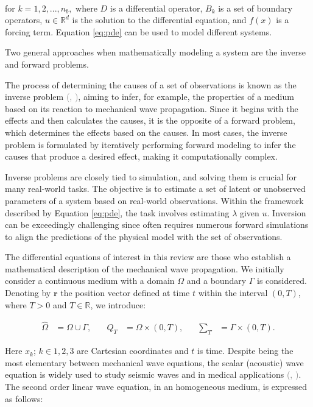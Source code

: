 \documentclass{tufte-handout}
\renewcommand{\citep}[2][]{\textcolor{gray}{(\citeauthor{#2}, \citeyear[#1]{#2})}}
\begin{document}
\

 for $k = 1, 2, ..., n_b,$ where $D$ is a differential operator, $B_k$ is a set of boundary operators, $u \in \mathbb{R}^{d}$ is the solution to the differential equation, and $f(x)$ is a forcing term. Equation \ref{eq:pde} can be used to model different systems. 
 
 Two general approaches when mathematically modeling a system are the inverse and forward problems. 
 
The process of determining the causes of a set of observations is known as the inverse problem \citep{Tarantola}, aiming to infer, for example, the properties of a medium based on its reaction to mechanical wave propagation. Since it begins with the effects and then calculates the causes, it is the opposite of a forward problem, which determines the effects based on the causes. In most cases, the inverse problem is formulated by iteratively performing forward modeling to infer the causes that produce a desired effect, making it computationally complex.


Inverse problems are closely tied to simulation, and solving them is crucial for many real-world tasks. The objective is to estimate a set of latent or unobserved parameters of a system based on real-world observations. Within the framework described by Equation \ref{eq:pde}, the task involves estimating $\lambda$ given $u$. Inversion can be exceedingly challenging since often requires numerous forward simulations to align the predictions of the physical model with the set of observations. 

The differential equations of interest in this review are those who establish a mathematical description of the mechanical wave propagation. We initially consider a continuous medium with a domain $\Omega$ and a boundary $\Gamma$ is considered. Denoting by $\mathbf{r}$ the position vector defined at time $ t $ within the interval $(0, T)$, where $ T > 0 $ and $ T \in \mathbb{R} $, we introduce: 

$$
\begin{aligned}
\hat{\Omega} &= \Omega \cup \Gamma, &\quad
Q_T &= \Omega \times (0,T), &\quad
\sum_T &= \Gamma \times (0,T).
\end{aligned}
$$

Here $x_k$; $k  \in {1, 2, 3}$ are Cartesian coordinates and $t$ is time. Despite being the most elementary between mechanical wave equations, the scalar (acoustic) wave equation is widely used to study seismic waves and in medical applications \citep{alkhadhr_wave_2023}. The second order linear wave equation, in an homogeneous medium, is expressed as follows:
\end{document}
